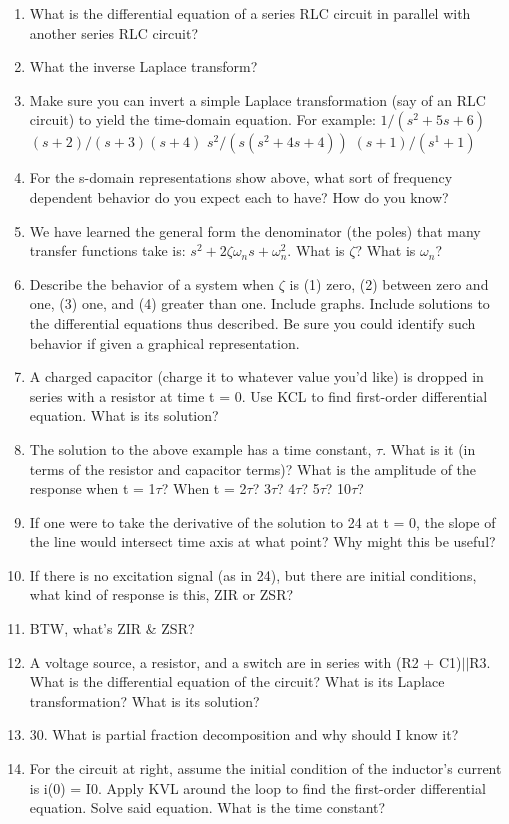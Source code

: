 \documentclass[11pt]{book}
\begin{document}
\begin{enumerate}
	\item What is the differential equation of a series RLC circuit in parallel with another series RLC circuit?
	\item What the inverse Laplace transform?
	\item Make sure you can invert a simple Laplace transformation (say of an RLC circuit) to yield the time-domain equation. For example:
	\subitem $1/(s^2+5s+6)$
	\subitem $(s+2)/(s+3)(s+4)$
	\subitem $s^2/(s(s^2+4s+4))$
	\subitem $(s+1)/(s^1+1)$
	\item For the s-domain representations show above, what sort of frequency dependent behavior do you expect each to have? How do you know?
	\item We have learned the general form the denominator (the poles) that many transfer functions take is: $s^2 + 2\zeta \omega_n s + \omega_n^2$. What is $\zeta$? What is $\omega_n$?
	\item Describe the behavior of a system when $\zeta$ is (1) zero, (2) between zero and one, (3) one, and (4) greater than one. Include graphs. Include solutions to the differential equations thus described. Be sure you could identify such behavior if given a graphical representation.
	\item A charged capacitor (charge it to whatever value you’d like) is dropped in series with a resistor at time t = 0. Use KCL to find first-order differential equation. What is its solution?
	\item The solution to the above example has a time constant, $\tau$. What is it (in terms of the resistor and capacitor terms)? What is the amplitude of the response when t = 1$\tau$? When t = 2$\tau$? 3$\tau$? 4$\tau$? 5$\tau$? 10$\tau$?
	\item If one were to take the derivative of the solution to 24 at t = 0, the slope of the line would intersect time axis at what point? Why might this be useful?
	\item If there is no excitation signal (as in 24), but there are initial conditions, what kind of response is this, ZIR or ZSR?
	\item BTW, what’s ZIR \& ZSR?
	\item A voltage source, a resistor, and a switch are in series with (R2 + C1)$\vert\vert$R3. What is the differential equation of the circuit? What is its Laplace transformation? What is its solution?
	\item 30.	What is partial fraction decomposition and why should I know it?
	\item For the circuit at right, assume the initial condition of the inductor’s current is i(0) = I0. Apply KVL around the loop to find the first-order differential equation. Solve said equation. What is the time constant?

\end{enumerate}
\end{document}
